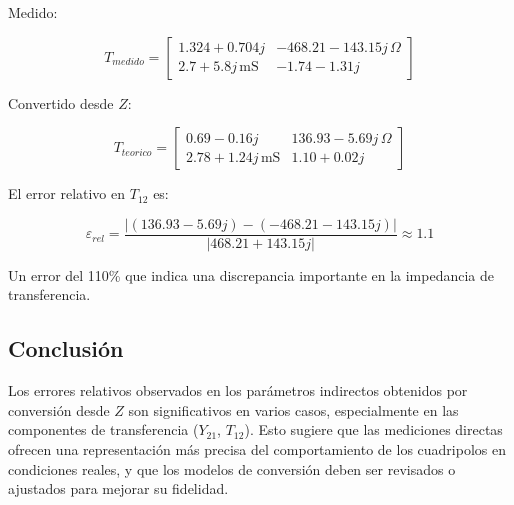 Medido:


\[
T_{medido} =
\begin{bmatrix}
1.324 + 0.704j & -468.21 - 143.15j\,\Omega \\
2.7 + 5.8j\,\mathrm{mS} & -1.74 - 1.31j
\end{bmatrix}
\]



Convertido desde $Z$:


\[
T_{teorico} =
\begin{bmatrix}
0.69 - 0.16j & 136.93 - 5.69j\,\Omega \\
2.78 + 1.24j\,\mathrm{mS} & 1.10 + 0.02j
\end{bmatrix}
\]



El error relativo en $T_{12}$ es:



\[
\varepsilon_{rel} = \frac{|(136.93 - 5.69j) - (-468.21 - 143.15j)|}{|468.21 + 143.15j|} \approx 1.1
\]



Un error del 110\% que indica una discrepancia importante en la impedancia de transferencia.

\subsection*{Conclusión}

Los errores relativos observados en los parámetros indirectos obtenidos por conversión desde $Z$ son significativos en varios casos, especialmente en las componentes de transferencia ($Y_{21}$, $T_{12}$). Esto sugiere que las mediciones directas ofrecen una representación más precisa del comportamiento de los cuadripolos en condiciones reales, y que los modelos de conversión deben ser revisados o ajustados para mejorar su fidelidad.

